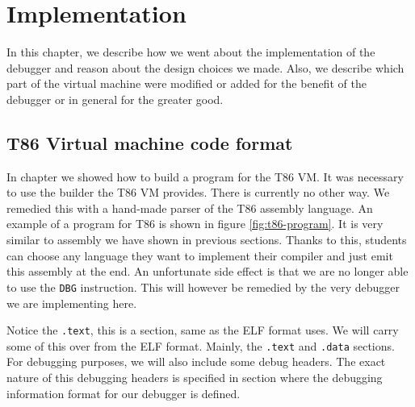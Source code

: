\chapter{Implementation}
In this chapter, we describe how we went about the implementation
of the debugger and reason about the design choices we made.
Also, we describe which part of the virtual machine were
modified or added for the benefit of the debugger or in
general for the greater good.

\section{T86 Virtual machine code format}
In chapter  we showed how to build a program for the T86 VM. It was
necessary to use the builder the T86 VM provides. There is currently no other
way. We remedied this with a hand-made parser of the T86 assembly language. An
example of a program for T86 is shown in figure \ref{fig:t86-program}. It is
very similar to assembly we have shown in previous sections. Thanks to this,
students can choose any language they want to implement their compiler and just
emit this assembly at the end. An unfortunate side effect is that we are no
longer able to use the \texttt{DBG} instruction. This will however be remedied
by the very debugger we are implementing here. 

Notice the \texttt{.text}, this is a section, same as the ELF format uses. We
will carry some of this over from the ELF format. Mainly, the \texttt{.text}
and \texttt{.data} sections. For debugging purposes, we will also include some
debug headers. The exact nature of this debugging headers is specified in
section  where the debugging information format for our debugger is
defined.

